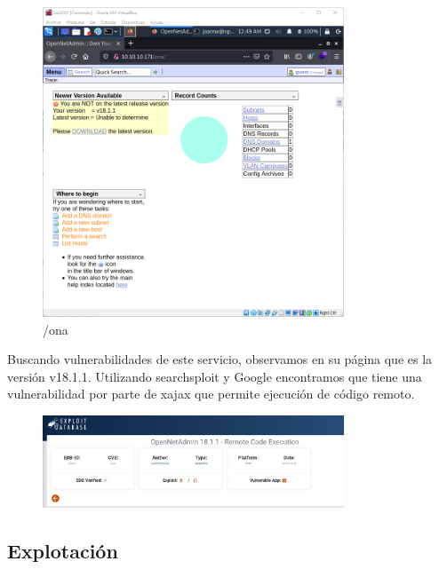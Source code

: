 \documentclass{article}
\begin{document}
\begin{figure}[h]
	\center
	\includegraphics[width=0.8\textwidth]{images/openadmin/5-ona.png}
	\caption{/ona}
\end{figure}

Buscando vulnerabilidades de este servicio, observamos en su página que es la versión v18.1.1. Utilizando searchsploit y Google encontramos que tiene una vulnerabilidad por parte de xajax que permite ejecución de código remoto.
\begin{figure}[h]
	\center
	\includegraphics[width=0.8\textwidth]{images/openadmin/6-exploit.png}
	\caption{}
\end{figure}

\subsection{Explotación}
\end{document}
